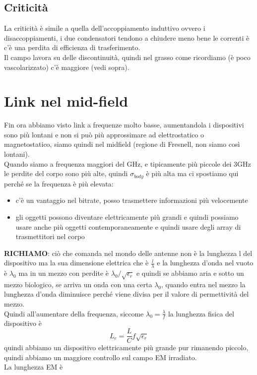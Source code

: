 \documentclass[oneside, 12pt]{extbook}
\begin{document}
\subsection{Criticità}
La criticità è simile a quella dell'accoppiamento induttivo ovvero i disaccoppiamenti, i due condensatori tendono a chiudere meno bene le correnti è c'è una perdita di efficienza di trasferimento.\\Il campo lavora su delle discontinuità, quindi nel grasso come ricordiamo (è poco vascolarizzato) c'è maggiore (vedi sopra).\\


\section{Link nel mid-field}
Fin ora abbiamo visto link a frequenze molto basse, aumentandola i dispositivi sono più lontani e non si può più approssimare ad elettrostatico o magnetostatico, siamo quindi nel midfield (regione di Fresnell, non siamo così lontani).\\Quando siamo a frequenza maggiori del GHz, e tipicamente più piccole dei 3GHz le perdite del corpo sono più alte, quindi $\sigma_{body}$ è più alta ma ci spostiamo qui perché se la frequenza è più elevata:
\begin{itemize}
	\item c'è un vantaggio nel bitrate, posso trasmettere informazioni più velocemente
	\item gli oggetti possono diventare elettricamente più grandi e quindi possiamo usare anche più oggetti contemporaneamente e quindi usare degli array di trasmettitori nel corpo
\end{itemize}
\textbf{RICHIAMO}: ciò che comanda nel mondo delle antenne non è la lunghezza l del dispositivo ma la sua dimensione elettrica che è $\frac{l}{\lambda}$ e la lunghezza d'onda nel vuoto è $\lambda_0$ ma in un mezzo con perdite è $\lambda_0/\sqrt{\epsilon_r}$ e quindi se abbiamo aria e sotto un mezzo biologico, se arriva un onda con una certa $\lambda_0$, quando entra nel mezzo la lunghezza d'onda diminuisce perché viene divisa per il valore di permettività del mezzo.\\Quindi all'aumentare della frequenza, siccome $\lambda_0 = \frac{\lambda}{f}$ la lunghezza fisica del dispositivo è 
\begin{equation}
	L_e = \frac{L}{C}f \sqrt{\epsilon_r}	
\end{equation}
quindi abbiamo un dispositivo elettricamente più grande pur rimanendo piccolo, quindi abbiamo un maggiore controllo sul campo EM irradiato.\\La lunghezza EM è 
\end{document}
